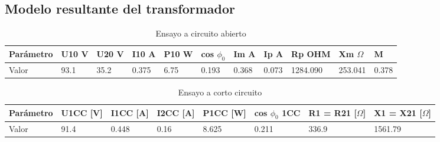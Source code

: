 \documentclass[a4paper]{article}
\begin{document}
\subsection{Modelo resultante del transformador}

\begin{table}[H]
\begin{tabular}{|l|l|l|l|l|l|l|l|l|l|l|}
\hline
Parámetro & U10 V & U20 V & I10 A & P10 W & cos $\phi_0$ & Im A  & Ip A  & Rp OHM   & Xm $\Omega$ & M     \\ \hline
Valor     & 93.1  & 35.2  & 0.375 & 6.75  & 0.193        & 0.368 & 0.073 & 1284.090 & 253.041     & 0.378 \\ \hline
\end{tabular}
\caption {Ensayo a circuito abierto}
\end{table}

\begin{table}[H]
\begin{tabular}{|l|l|l|l|l|l|l|l|}
\hline
Parámetro & U1CC [V] & I1CC [A] & I2CC [A] & P1CC [W] & cos $\phi_0$ 1CC & R1 = R21 [$\Omega$] & X1 = X21 [$\Omega$] \\ \hline
Valor     & 91.4     & 0.448    & 0.16     & 8.625    & 0.211            & 336.9               & 1561.79             \\ \hline
\end{tabular}
\caption {Ensayo a corto circuito}
\end{table}
\end{document}
